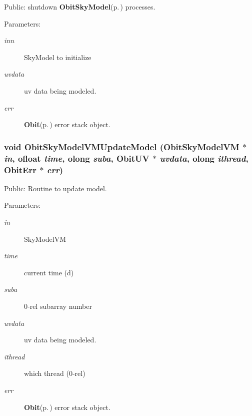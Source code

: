 Public: shutdown {\bf Obit\-Sky\-Model}{\rm (p.\,\pageref{structObitSkyModel})} processes. 

\begin{Desc}
\item[Parameters:]
\begin{description}
\item[{\em inn}]Sky\-Model to initialize \item[{\em uvdata}]uv data being modeled. \item[{\em err}]{\bf Obit}{\rm (p.\,\pageref{structObit})} error stack object. \end{description}
\end{Desc}
\subsubsection{\setlength{\rightskip}{0pt plus 5cm}void Obit\-Sky\-Model\-VMUpdate\-Model ({\bf Obit\-Sky\-Model\-VM} $\ast$ {\em in}, {\bf ofloat} {\em time}, {\bf olong} {\em suba}, {\bf Obit\-UV} $\ast$ {\em uvdata}, {\bf olong} {\em ithread}, {\bf Obit\-Err} $\ast$ {\em err})}\label{ObitSkyModelVM_8c_a19}


Public: Routine to update model. 

\begin{Desc}
\item[Parameters:]
\begin{description}
\item[{\em in}]Sky\-Model\-VM \item[{\em time}]current time (d) \item[{\em suba}]0-rel subarray number \item[{\em uvdata}]uv data being modeled. \item[{\em ithread}]which thread (0-rel) \item[{\em err}]{\bf Obit}{\rm (p.\,\pageref{structObit})} error stack object. \end{description}
\end{Desc}

